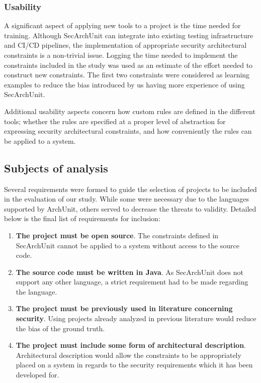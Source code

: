 \subsubsection{Usability}
A significant aspect of applying new tools to a project is the time needed for training. Although SecArchUnit can integrate into existing testing infrastructure and CI/CD pipelines, the implementation of appropriate security architectural constraints is a non-trivial issue. Logging the time needed to implement the constraints included in the study was used as an estimate of the effort needed to construct new constraints. The first two constraints were considered as learning examples to reduce the bias introduced by us having more experience of using SecArchUnit.

Additional usability aspects concern how custom rules are defined in the different tools; whether the rules are specified at a proper level of abstraction for expressing security architectural constraints, and how conveniently the rules can be applied to a system.

\subsection{Subjects of analysis} \label{sct:selected-systems}

Several requirements were formed to guide the selection of projects to be included in the evaluation of our study. While some were necessary due to the languages supported by ArchUnit, others served to decrease the threats to validity. Detailed below is the final list of requirements for inclusion:

\begin{enumerate}
    \item \textbf{The project must be open source}. The constraints defined in SecArchUnit cannot be applied to a system without access to the source code.
    \item \textbf{The source code must be written in Java}. As SecArchUnit does not support any other language, a strict requirement had to be made regarding the language. 
    \item \textbf{The project must be previously used in literature concerning security}. Using projects already analyzed in previous literature would reduce the bias of the ground truth. 
    \item \textbf{The project must include some form of architectural description}. Architectural description would allow the constraints to be appropriately placed on a system in regards to the security requirements which it has been developed for.
\end{enumerate}

